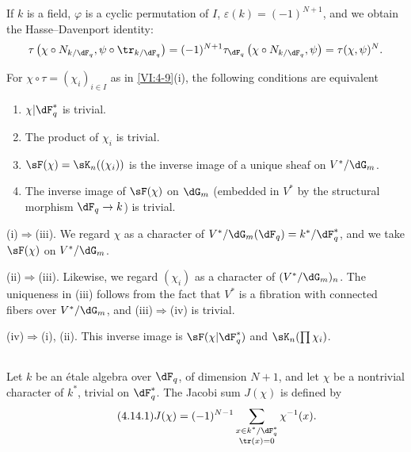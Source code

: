 If $k$ is a field, $\varphi$ is a cyclic permutation of $I$, 
$\varepsilon(k) = (-1)^{N+1}$, and we obtain the Hasse--Davenport identity: 
\[
  \tau\left(\chi\circ N_{k/\dF_q},\psi\circ \tr_{k/\dF_q}\right) = (-1)^{N+1} \tau_{\dF_q}\left(\chi\circ N_{k/\dF_q},\psi\right) = \tau(\chi,\psi)^N \text{.} 
\]





\begin{lemma_}\label{VI:4-13}
For $\chi\circ \tau=(\chi_i)_{i\in I}$ as in \ref{VI:4-9}(i), the
following conditions are equivalent 
\begin{enumerate}[\indent (i)]
  \item $\chi| \dF_q^\ast$ is trivial. 
  \item The product of $\chi_i$ is trivial. 
  \item $\sF(\chi) = \sK_n((\chi_i))$ is the inverse image of a unique 
    sheaf on $V^\ast/\dG_m$. 
  \item The inverse image of $\sF(\chi)$ on $\dG_m$ (embedded in 
    $V^\ast$ by the structural morphism $\dF_q \to k$) is trivial. 
\end{enumerate}
\end{lemma_}

(i)$\Rightarrow$(iii). We regard $\chi$ as a character of 
$V^\ast/\dG_m(\dF_q)=k^\ast/\dF_q^\ast$, and we take $\sF(\chi)$ on 
$V^\ast/\dG_m$. 

(ii)$\Rightarrow$(iii). Likewise, we regard $(\chi_i)$ as a character 
of $(V^\ast/\dG_m)_n$. The uniqueness in (iii) follows from the fact that $V^\ast$ is 
a fibration with connected fibers over $V^\ast/\dG_m$, and (iii)$\Rightarrow$(iv)  
is trivial. 

(iv)$\Rightarrow$(i), (ii). This inverse image is 
$\sF(\chi|\dF_q^\ast)$ and $\sK_n(\prod \chi_i)$. 





\subsection{}\label{VI:4-14}

Let $k$ be an étale algebra over $\dF_q$, of 
dimension $N+1$, and let $\chi$ be a nontrivial character of $k^\ast$, trivial on 
$\dF_q^\ast$. The Jacobi sum $J(\chi)$ is defined by 
\begin{equation*}\tag{4.14.1}\label{VI:eq:4-14-1}
  J(\chi) = (-1)^{N-1} \sum_{\substack{x\in k^\ast/\dF_q^\ast \\ \tr(x)=0}} \chi^{-1}(x) \text{.} 
\end{equation*}

